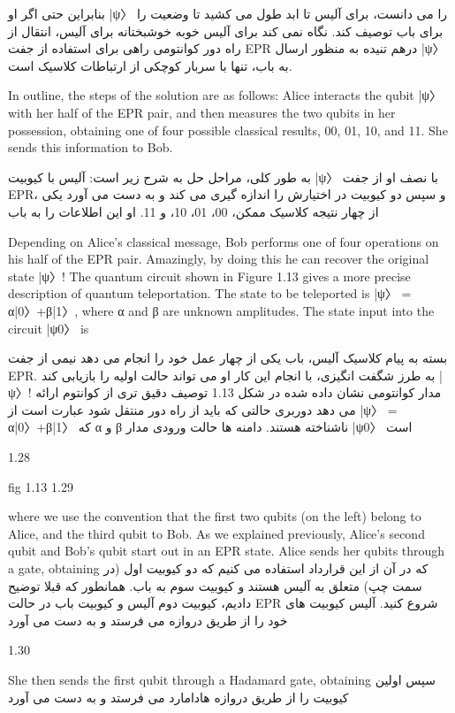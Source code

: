 \documentclass{book}
\begin{document}
بنابراین حتی اگر او |ψ〉 را می دانست، برای آلیس تا ابد طول می کشید تا وضعیت را برای باب توصیف کند. نگاه نمی کند برای آلیس خوبه خوشبختانه برای آلیس، انتقال از راه دور کوانتومی راهی برای استفاده از جفت EPR درهم تنیده به منظور ارسال |ψ〉 به باب، تنها با سربار کوچکی از ارتباطات کلاسیک است.


In outline, the steps of the solution are as follows: Alice interacts the qubit |ψ〉 with
her half of the EPR pair, and then measures the two qubits in her possession, obtaining
one of four possible classical results, 00, 01, 10, and 11. She sends this information to
Bob. 

به طور کلی، مراحل حل به شرح زیر است: آلیس با کیوبیت |ψ〉 با
نصف او از جفت EPR، و سپس دو کیوبیت در اختیارش را اندازه گیری می کند و به دست می آورد
یکی از چهار نتیجه کلاسیک ممکن، 00، 01، 10، و 11. او این اطلاعات را به
باب


Depending on Alice’s classical message, Bob performs one of four operations on his
half of the EPR pair. Amazingly, by doing this he can recover the original state |ψ〉!
The quantum circuit shown in Figure 1.13 gives a more precise description of quantum
teleportation. The state to be teleported is |ψ〉 = α|0〉+β|1〉, where α and β are unknown
amplitudes. The state input into the circuit |ψ0〉 is

بسته به پیام کلاسیک آلیس، باب یکی از چهار عمل خود را انجام می دهد
نیمی از جفت EPR. به طرز شگفت انگیزی، با انجام این کار او می تواند حالت اولیه را بازیابی کند |ψ〉!
مدار کوانتومی نشان داده شده در شکل 1.13 توصیف دقیق تری از کوانتوم ارائه می دهد
دوربری حالتی که باید از راه دور منتقل شود عبارت است از |ψ〉 = α|0〉+β|1〉 که α و β ناشناخته هستند.
دامنه ها حالت ورودی مدار |ψ0〉 است


1.28

fig 1.13
1.29


where we use the convention that the first two qubits (on the left) belong to Alice, and
the third qubit to Bob. As we explained previously, Alice’s second qubit and Bob’s qubit
start out in an EPR state. Alice sends her qubits through a gate, obtaining
که در آن از این قرارداد استفاده می کنیم که دو کیوبیت اول (در سمت چپ) متعلق به آلیس هستند و
کیوبیت سوم به باب. همانطور که قبلا توضیح دادیم، کیوبیت دوم آلیس و کیوبیت باب
در حالت EPR شروع کنید. آلیس کیوبیت های خود را از طریق دروازه می فرستد و به دست می آورد

1.30


She then sends the first qubit through a Hadamard gate, obtaining
سپس اولین کیوبیت را از طریق دروازه هادامارد می فرستد و به دست می آورد
\end{document}
